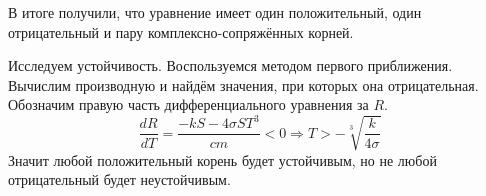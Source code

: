     В итоге получили, что уравнение имеет один положительный, один отрицательный и пару комплексно-сопряжённых корней.

    Исследуем устойчивость. Воспользуемся методом первого приближения. Вычислим производную и найдём значения, при которых она отрицательная. Обозначим правую часть дифференциального уравнения за $ R $.
    \[
        \frac{dR}{dT} = \frac{-kS - 4\sigma S T^3}{cm} < 0 \Rightarrow T > -\sqrt[3]{\frac{k}{4 \sigma}}
    \]
    Значит любой положительный корень будет устойчивым, но не любой отрицательный будет неустойчивым. 